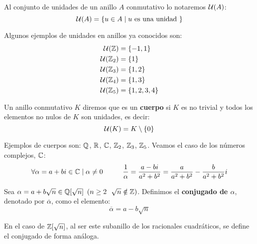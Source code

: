 \begin{notacion}
Al conjunto de unidades de un anillo $A$ conmutativo lo notaremos $\mathcal{U}(A)$:
$$\mathcal{U}(A) = \{u \in A \mid u \mbox{ es una unidad }\}$$
\end{notacion}

\begin{ejemplo}
Algunos ejemplos de unidades en anillos ya conocidos son:
\begin{align*}
    \mathcal{U}(\mathbb Z) &= \{-1, 1\} \\
    \mathcal{U}(\mathbb Z_2) &= \{1\} \\
    \mathcal{U}(\mathbb Z_3) &= \{1,2\} \\
    \mathcal{U}(\mathbb Z_4) &= \{1, 3\} \\
    \mathcal{U}(\mathbb Z_5) &= \{1, 2, 3, 4\}
\end{align*}
\end{ejemplo}

\begin{definicion}[Cuerpo]
    Un anillo conmutativo $K$ diremos que es un \textbf{cuerpo} si $K$ es no trivial y todos los elementos no nulos
    de $K$ son unidades, es decir:
    $$\mathcal{U}(K) = K \setminus \{0\}$$
\end{definicion}

\begin{ejemplo}
    Ejemplos de cuerpos son: $\mathbb Q$, $\mathbb R$, $\mathbb C$, $\mathbb Z_2$, $\mathbb Z_3$, $\mathbb Z_5$. Veamos el caso de los números complejos, $\mathbb C$:
    $$\forall \alpha = a+bi \in \mathbb C \mid \alpha \neq 0 \hspace{1cm} \dfrac{1}{\alpha} = \dfrac{a-bi}{a^2+b^2} = \dfrac{a}{a^2+b^2} -
        \dfrac{b}{a^2+b^2}i$$
\end{ejemplo}

\begin{definicion}[Conjugado]
    Sea $\alpha= a+b \sqrt{n} \in \mathbb Q[\sqrt{n}]$ $(n \geq 2~~\sqrt{n}\notin \mathbb Z)$. Definimos el \textbf{conjugado de $\alpha$}, denotado por $\overline{\alpha}$, como el elemento:
    $$\overline{\alpha} = a - b\sqrt{n}$$
\end{definicion}

En el caso de $\mathbb Z[\sqrt{n}]$, al ser este subanillo de los racionales cuadráticos, se define el conjugado de forma análoga.\\

